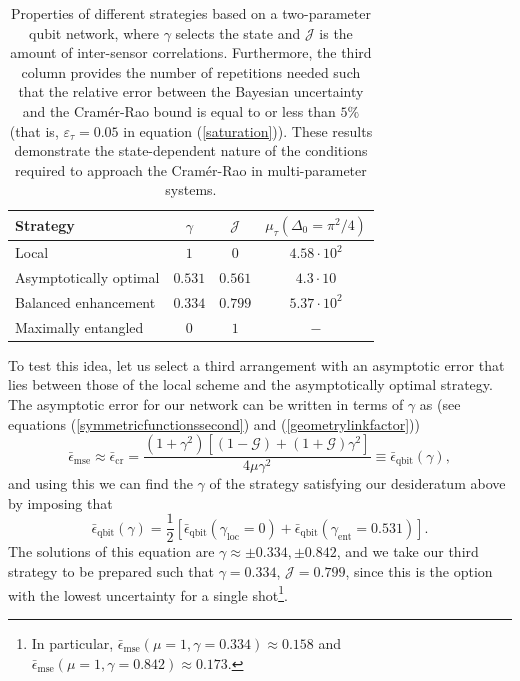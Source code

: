\begin{table} [t]
\centering
{\renewcommand{\arraystretch}{1.2}
\begin{tabular}{|l|c|c|c|}
\hline
Strategy & $\gamma$ & $\mathcal{J}$ & $\mu_{\tau} (\Delta_0=\pi^2/4)$ \\
\hline
\hline
Local & $1$ & $0$ & $4.58\cdot 10^2$ \\
Asymptotically optimal & $0.531$ &$0.561$ & $4.3\cdot 10$ \\
Balanced enhancement & $0.334$ & $0.799$ & $5.37\cdot 10^2$  \\
Maximally entangled & $0$ & $1$ & $-$ \\
\hline
\end{tabular}}
\caption[Bayesian study of a quantum sensing network]{Properties of different strategies based on a two-parameter qubit network, where $\gamma$ selects the state and $\mathcal{J}$ is the amount of inter-sensor correlations. Furthermore, the third column provides the number of repetitions needed such that the relative error between the Bayesian uncertainty and the Cram\'{e}r-Rao bound is equal to or less than $5\%$ (that is, $\varepsilon_\tau = 0.05$ in equation (\ref{saturation})). These results demonstrate the state-dependent nature of the conditions required to approach the Cram\'{e}r-Rao in multi-parameter systems.}
\label{multinetworkstable}
\end{table}

To test this idea, let us select a third arrangement with an asymptotic error that lies between those of the local scheme and the asymptotically optimal strategy. The asymptotic error for our network can be written in terms of $\gamma$ as (see equations (\ref{symmetricfunctionssecond}) and (\ref{geometrylinkfactor}))
\begin{equation}
\bar{\epsilon}_\mathrm{mse} \approx \bar{\epsilon}_{\mathrm{cr}} = \frac{\left(1+\gamma^2\right)\left[\left(1-\mathcal{G}\right)+\left(1+\mathcal{G}\right)\gamma^2\right]}{4\mu \gamma^2} \equiv \bar{\epsilon}_{\mathrm{qbit}}\left(\gamma\right),
\label{crmsetwoqubitnetwork}
\end{equation}
and using this we can find the $\gamma$ of the strategy satisfying our desideratum above by imposing that
\begin{equation}
\bar{\epsilon}_{\mathrm{qbit}}\left(\gamma\right) = \frac{1}{2}\left[\bar{\epsilon}_{\mathrm{qbit}}\left(\gamma_{\mathrm{loc}}=0\right) + \bar{\epsilon}_{\mathrm{qbit}}\left(\gamma_{\mathrm{ent}}=0.531\right)\right].
\end{equation}
The solutions of this equation are $\gamma \approx \pm 0.334 , \pm 0.842$, and we take our third strategy to be prepared such that $\gamma = 0.334$, $\mathcal{J} = 0.799$, since this is the option with the lowest uncertainty for a single shot\footnote{In particular, $\bar{\epsilon}_{\mathrm{mse}}(\mu = 1, \gamma = 0.334) \approx 0.158$ and $\bar{\epsilon}_{\mathrm{mse}}(\mu = 1, \gamma = 0.842) \approx 0.173$.}. 

